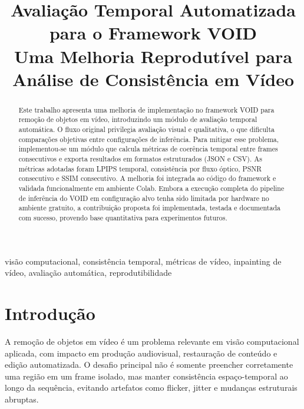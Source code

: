 \documentclass[conference]{IEEEtran}
\begin{document}
\title{Avaliação Temporal Automatizada para o Framework VOID\\
\large{Uma Melhoria Reprodutível para Análise de Consistência em Vídeo}}

\author{
}

\maketitle

\begin{abstract}
Este trabalho apresenta uma melhoria de implementação no framework VOID para remoção de objetos em vídeo, introduzindo um módulo de avaliação temporal automática. O fluxo original privilegia avaliação visual e qualitativa, o que dificulta comparações objetivas entre configurações de inferência. Para mitigar esse problema, implementou-se um módulo que calcula métricas de coerência temporal entre frames consecutivos e exporta resultados em formatos estruturados (JSON e CSV). As métricas adotadas foram LPIPS temporal, consistência por fluxo óptico, PSNR consecutivo e SSIM consecutivo. A melhoria foi integrada ao código do framework e validada funcionalmente em ambiente Colab. Embora a execução completa do pipeline de inferência do VOID em configuração alvo tenha sido limitada por hardware no ambiente gratuito, a contribuição proposta foi implementada, testada e documentada com sucesso, provendo base quantitativa para experimentos futuros.
\end{abstract}

\begin{IEEEkeywords}
visão computacional, consistência temporal, métricas de vídeo, inpainting de vídeo, avaliação automática, reprodutibilidade
\end{IEEEkeywords}

\section{Introdução}
A remoção de objetos em vídeo é um problema relevante em visão computacional aplicada, com impacto em produção audiovisual, restauração de conteúdo e edição automatizada. O desafio principal não é somente preencher corretamente uma região em um frame isolado, mas manter consistência espaço-temporal ao longo da sequência, evitando artefatos como flicker, jitter e mudanças estruturais abruptas.
\end{document}
